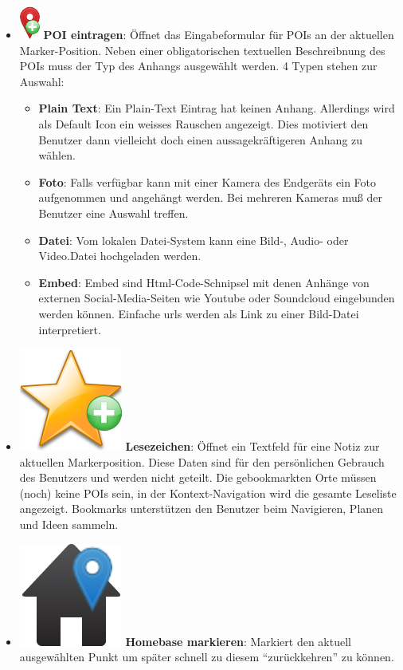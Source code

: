 \begin{itemize}[leftmargin=*,noitemsep,topsep=1ex,parsep=0pt,partopsep=0pt]
\item \includegraphics[scale=0.55]{bilder/icons/add-marker.png} \textbf{POI eintragen}: Öffnet das Eingabeformular für POIs an der aktuellen Marker-Position. Neben einer obligatorischen textuellen Beschreibnung des POIs muss der Typ des Anhangs ausgewählt werden. 4 Typen stehen zur Auswahl:
	\begin{itemize}[leftmargin=*,noitemsep,topsep=1ex,parsep=0pt,partopsep=0pt]
		\item \textbf{Plain Text}: Ein Plain-Text Eintrag hat keinen Anhang. Allerdings wird als Default Icon ein weisses Rauschen angezeigt. Dies motiviert den Benutzer dann vielleicht doch einen aussagekräftigeren Anhang zu wählen.
		\item \textbf{Foto}: Falls verfügbar kann mit einer Kamera des Endgeräts ein Foto aufgenommen und angehängt werden. Bei mehreren Kameras muß der Benutzer eine Auswahl treffen.
		\item \textbf{Datei}: Vom lokalen Datei-System kann eine Bild-, Audio- oder Video.Datei hochgeladen werden.
		\item \textbf{Embed}: Embed sind Html-Code-Schnipsel mit denen Anhänge von externen Social-Media-Seiten wie Youtube oder Soundcloud eingebunden werden können. Einfache urls werden als Link zu einer Bild-Datei interpretiert.
	\end{itemize}
\item \includegraphics[scale=0.15]{bilder/icons/add-bookmark.png} \textbf{Lesezeichen}: Öffnet ein Textfeld für eine Notiz zur aktuellen Markerposition. Diese Daten sind für den persönlichen Gebrauch des Benutzers und werden nicht geteilt. Die gebookmarkten Orte müssen (noch) keine POIs sein, in der Kontext-Navigation wird die gesamte Leseliste angezeigt. Bookmarks unterstützen den Benutzer beim Navigieren, Planen und Ideen sammeln.
\item \includegraphics[scale=0.15]{bilder/icons/set-home.png} \textbf{Homebase markieren}: Markiert den aktuell ausgewählten Punkt um später schnell zu diesem "`zurückkehren"' zu können.

\end{itemize}
